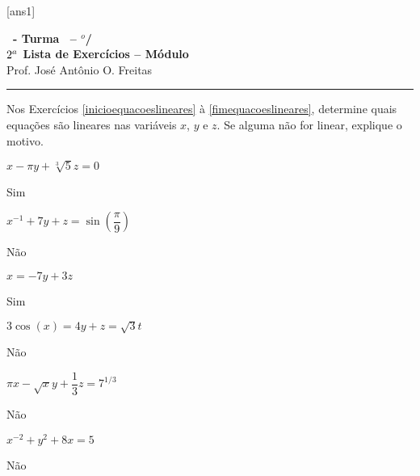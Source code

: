 \documentclass[12pt]{exam}
\begin{document}
  [ans1]
  \begin{center}
    {\Large\bf \disciplina\ - Turma \turma\ -- \semestre$^{o}$/\ano} \\ \vspace{9pt} {\large\bf
        $2^a$ Lista de Exercícios -- Módulo \numeromodulo}\\ \vspace{9pt} Prof. José Antônio O. Freitas
  \end{center}
  \hrule


Nos Exercícios \ref{inicioequacoeslineares} à \ref{fimequacoeslineares}, determine quais equações são lineares nas variáveis $x$, $y$ e $z$. Se alguma não for linear, explique o motivo.

\begin{exercicio}\label{inicioequacoeslineares}
    $x - \pi y + \sqrt[3]{5}z = 0$
    \begin{solucao}
        Sim
    \end{solucao}
\end{exercicio}

\begin{exercicio}
    $x^{-1} + 7y + z = \sin(\dfrac{\pi}{9})$
    \begin{solucao}
    Não
    \end{solucao}
\end{exercicio}

\begin{exercicio}
    $x = -7y + 3z$
    \begin{solucao}
        Sim
    \end{solucao}
\end{exercicio}

\begin{exercicio}
    $3\cos(x) = 4y + z = \sqrt{3}t$
    \begin{solucao}
        Não
    \end{solucao}
\end{exercicio}

\begin{exercicio}
    $\pi x - \sqrt{x}y + \dfrac{1}{3}z = 7^{1/3}$
    \begin{solucao}
        Não
    \end{solucao}
\end{exercicio}

\begin{exercicio}
    $x^{-2} + y^2 + 8x = 5$
    \begin{solucao}
        Não
    \end{solucao}
\end{exercicio}
\end{document}
